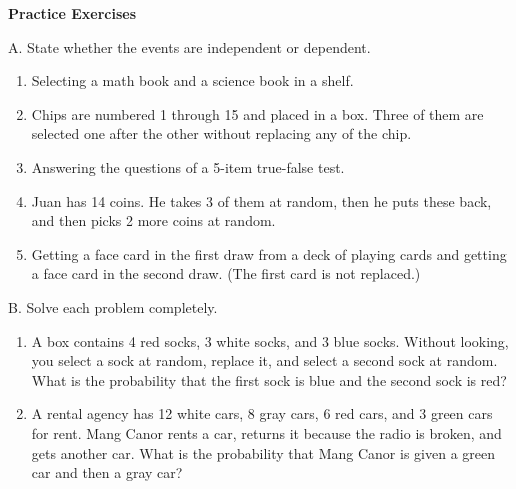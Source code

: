 \textbf{Practice Exercises}

\vspce

A. State whether the events are independent or dependent.

\begin{enumerate}[label = \arabic*. ]
\item Selecting a math book and a science book in a shelf.
\item Chips are numbered 1 through 15 and placed in a box. Three of them are selected one after the other without replacing any of the chip.
\item Answering the questions of a 5-item true-false test.

\item Juan has 14 coins. He takes 3 of them  at  random, then he puts  these back, and then picks 2 more coins at  random.

\item Getting a face card in the first draw from a deck of playing cards and getting a face card in the second draw. (The first card is not replaced.)

\end{enumerate}  

B. Solve each problem completely. 
\begin{enumerate}[label = \arabic*. ]
\item A box contains 4 red socks, 3 white socks, and 3 blue socks. Without looking, you select a sock at random, replace it, and select a second sock at random. What is the probability that the first sock is blue and the second sock is red?  
\item A rental agency has 12 white cars, 8 gray cars, 6 red cars, and 3 green cars for rent. Mang Canor rents a car, returns it because the radio is broken, and gets another car. What is the probability that Mang Canor is given a green car and then a gray car? 


\end{enumerate}   
